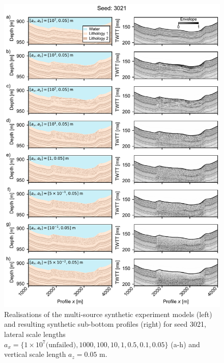 \documentclass[se,manuscript]{copernicus}
\begin{document}
\begin{figure}
    \includegraphics{figures/si_fig04.pdf}
    \caption{Realisations of the multi-source synthetic experiment models (left) and resulting synthetic sub-bottom profiles (right) for seed 3021, lateral scale lengths $a_x=\{1 \times 10^7 \text{(unfailed)}, 1000, 100, 10, 1, 0.5, 0.1, 0.05\}$ (a-h) and vertical scale length $a_z=0.05$ m.}
    \label{fig:multi-source-3021}
\end{figure}
\end{document}
